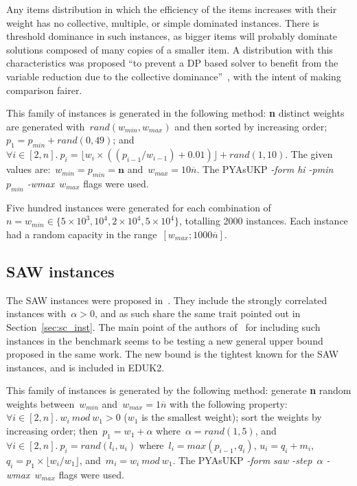 Any items distribution in which the efficiency of the items increases with their weight has no collective, multiple, or simple dominated instances.
There is threshold dominance in such instances, as bigger items will probably dominate solutions composed of many copies of a smaller item.
A distribution with this characteristics was proposed ``to prevent a DP based solver to benefit from the variable reduction due to the collective dominance''~\cite[p.~13]{pya}, with the intent of making comparison fairer.

This family of instances is generated in the following method: \textbf{n} distinct weights are generated with~\(rand(w_{min}, w_{max})\) and then sorted by increasing order;~\(p_1 = p_{min} + rand(0, 49)\); and~\(\forall i \in [2, n].~p_i = \lfloor w_i \times ((p_{i-1}/w_{i-1}) + 0.01)\rfloor + rand(1, 10)\).
The given values are:~\(w_{min} = p_{min} = \mathbf{n}\) and~\(w_{max} = 10\overline{n}\).
The PYAsUKP \emph{-form hi -pmin~\(p_{min}\) -wmax~\(w_{max}\)} flags were used.

Five hundred instances were generated for each combination of~\(n = w_{min} \in \{5\times10^3, 10^4, 2\times10^4, 5\times10^4\}\), totalling 2000 instances.
Each instance had a random capacity in the range~\([w_{max}; 1000\overline{n}]\).

\subsection{SAW instances}
\label{sec:saw_inst}

The SAW instances were proposed in~\cite{pya}.
They include the strongly correlated instances with~\(\alpha > 0\), and as such share the same trait pointed out in Section~\ref{sec:sc_inst}.
The main point of the authors of~\cite{pya} for including such instances in the benchmark seems to be testing a new general upper bound proposed in the same work.
The new bound is the tightest known for the SAW instances, and is included in EDUK2.

This family of instances is generated by the following method: generate \textbf{n} random weights between~\(w_{min}\) and~\(w_{max} = 1\overline{n}\) with the following property:~\(\forall i \in [2, n].~w_i~mod~w_1 > 0\) (\(w_1\) is the smallest weight); sort the weights by increasing order; then~\(p_1 = w_1 + \alpha\) where~\(\alpha = rand(1,5)\), and~\(\forall i \in [2, n].~p_i = rand(l_i, u_i)\) where~\(l_i = max(p_{i-1}, q_i)\), \(u_i = q_i + m_i\), \(q_i = p_1 \times \lfloor w_i / w_1 \rfloor \), and~\(m_i = w_i~mod~w_1\).
The PYAsUKP \emph{-form saw -step~\(\alpha\) -wmax~\(w_{max}\)} flags were used.

